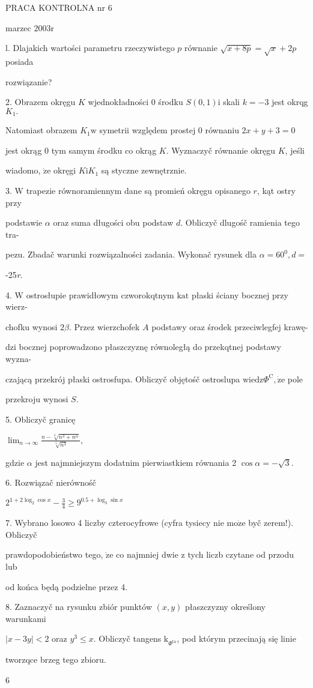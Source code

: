 \documentclass[a4paper,12pt]{article}
\begin{document}
PRACA KONTROLNA nr 6

marzec $2003\mathrm{r}$

l. Dlajakich wartości parametru rzeczywistego $p$ równanie $\sqrt{x+8p}=\sqrt{x}+2p$ posiada

rozwiązanie?

2. Obrazem okręgu $K$ wjednokładności $0$ środku $S(0,1)\mathrm{i}$ skali $k=-3$ jest okrqg $K_{1}.$

Natomiast obrazem $K_{1} \mathrm{w}$ symetrii względem prostej $0$ równaniu $2x+y+3 = 0$

jest okrąg $0$ tym samym środku co okrąg $K$. Wyznaczyč równanie okręgu $K$, jeśli

wiadomo, $\dot{\mathrm{z}}\mathrm{e}$ okręgi $K\mathrm{i}K_{1}$ są styczne zewnętrznie.

3. $\mathrm{W}$ trapezie równoramiennym dane są promień okręgu opisanego $r$, kąt ostry przy

podstawie $\alpha$ oraz suma długości obu podstaw $d$. Obliczyč dlugośč ramienia tego tra-

pezu. Zbadač warunki rozwiązalności zadania. Wykonač rysunek dla $\alpha=60^{0}, d=$

-25{\it r}.

4. $\mathrm{W}$ ostrosłupie prawidłowym czworokqtnym $\mathrm{k}\mathrm{a}\mathrm{t}$ płaski ściany bocznej przy wierz-

chofku wynosi $ 2\beta$. Przez wierzchofek $A$ podstawy oraz środek przeciwlegfej krawę-

dzi bocznej poprowadzono płaszczyznę równoległą do przekqtnej podstawy wyzna-

czającą przekrój płaski ostrosfupa. Obliczyč objętośč ostroslupa $\mathrm{w}\mathrm{i}\mathrm{e}\mathrm{d}\mathrm{z}\Phi^{\mathrm{C}}, \dot{\mathrm{z}}\mathrm{e}$ pole

przekroju wynosi $S.$

5. Obliczyč granicę

$\displaystyle \lim_{n\rightarrow\infty}\frac{n-\sqrt[3]{n^{3}+n^{\alpha}}}{\sqrt[5]{n^{3}}},$

gdzie $\alpha$ jest najmniejszym dodatnim pierwiastkiem równania 2 $\cos\alpha=-\sqrt{3}.$

6. Rozwiązač nierównośč

$2^{1+2\log_{2}\cos x}-\displaystyle \frac{3}{4}\geq 9^{0.5+\log_{3}\sin x}$

7. Wybrano losowo 4 liczby czterocyfrowe (cyfra tysiecy nie $\mathrm{m}\mathrm{o}\dot{\mathrm{z}}\mathrm{e}$ byč zerem!). Obliczyč

prawdopodobieństwo tego, $\dot{\mathrm{z}}\mathrm{e}$ co najmniej dwie $\mathrm{z}$ tych liczb czytane od przodu lub

od końca będą podzielne przez 4.

8. Zaznaczyč na rysunku zbiór punktów $(x,y)$ płaszczyzny określony warunkami

$|x-3y| <2$ oraz $y^{3}\leq x$. Obliczyč tangens $\mathrm{k}_{\Phi^{\mathrm{t}\mathrm{a}}}$, pod którym przecinają się linie

tworzqce brzeg tego zbioru.

6
\end{document}
